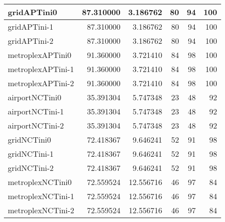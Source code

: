 \begin{longtable}{|l|r|r|r|r|r|}
gridAPTini0 & 87.310000 & 3.186762 & 80 & 94 & 100 \\ \hline
gridAPTini-1 & 87.310000 & 3.186762 & 80 & 94 & 100 \\ \hline
gridAPTini-2 & 87.310000 & 3.186762 & 80 & 94 & 100 \\ \hline
metroplexAPTini0 & 91.360000 & 3.721410 & 84 & 98 & 100 \\ \hline
metroplexAPTini-1 & 91.360000 & 3.721410 & 84 & 98 & 100 \\ \hline
metroplexAPTini-2 & 91.360000 & 3.721410 & 84 & 98 & 100 \\ \hline
airportNCTini0 & 35.391304 & 5.747348 & 23 & 48 & 92 \\ \hline
airportNCTini-1 & 35.391304 & 5.747348 & 23 & 48 & 92 \\ \hline
airportNCTini-2 & 35.391304 & 5.747348 & 23 & 48 & 92 \\ \hline
gridNCTini0 & 72.418367 & 9.646241 & 52 & 91 & 98 \\ \hline
gridNCTini-1 & 72.418367 & 9.646241 & 52 & 91 & 98 \\ \hline
gridNCTini-2 & 72.418367 & 9.646241 & 52 & 91 & 98 \\ \hline
metroplexNCTini0 & 72.559524 & 12.556716 & 46 & 97 & 84 \\ \hline
metroplexNCTini-1 & 72.559524 & 12.556716 & 46 & 97 & 84 \\ \hline
metroplexNCTini-2 & 72.559524 & 12.556716 & 46 & 97 & 84 \\ \hline
\end{longtable}
